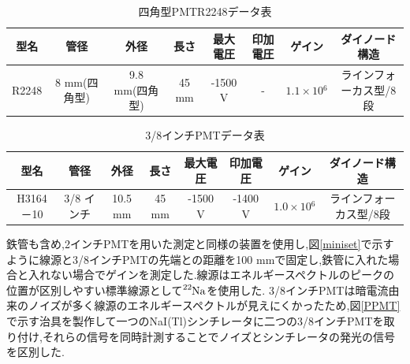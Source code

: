 \begin{table}[tbp]
	\centering
	  \begin{tabular}{cccccccc} \hline
		型名& 管径 & 外径 & 長さ & 最大電圧 & 印加電圧 & ゲイン & ダイノード構造 \\ \hline \hline
		R2248 & 8 mm(四角型) & 9.8 mm(四角型)& 45 mm & -1500 V & - & $1.1\times10{^{6}}$ &ラインフォーカス型/8段 \\ \hline
	\end{tabular}
	  \caption{四角型PMT\hspace{3pt}R2248データ表}
	  \label{R2248data}
\end{table}

\begin{table}[tbp]
	\centering
	
	  \begin{tabular}{cccccccc} \hline
		型名& 管径 & 外径 & 長さ & 最大電圧 & 印加電圧 & ゲイン & ダイノード構造 \\ \hline \hline
		H3164－10 & 3/8 インチ & 10.5 mm & 45 mm & -1500 V & -1400 V & $1.0\times10{^{6}}$ &ラインフォーカス型/8段　\\ \hline
	\end{tabular}
	  \caption{3/8インチPMTデータ表}
	  \label{3/8inchPMT}
\end{table}

鉄管も含め,2インチPMTを用いた測定と同様の装置を使用し,図\ref{miniset}で示すように線源と3/8インチPMTの先端との距離を100 mmで固定し,鉄管に入れた場合と入れない場合でゲインを測定した.線源はエネルギースペクトルのピークの位置が区別しやすい標準線源として$\ce{^{22}Na}$を使用した.
3/8インチPMTは暗電流由来のノイズが多く線源のエネルギースペクトルが見えにくかったため,図\ref{PPMT}で示す治具を製作して一つのNaI(Tl)シンチレータに二つの3/8インチPMTを取り付け,それらの信号を同時計測することでノイズとシンチレータの発光の信号を区別した.

